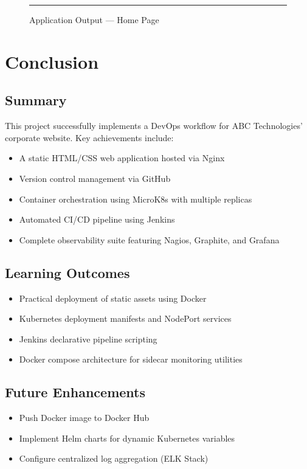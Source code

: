 \documentclass[12pt, a4paper]{article}
\begin{document}
\begin{figure}[H]
    \centering
    \rule{\textwidth}{8cm}
    \caption{Application Output --- Home Page}
    \label{fig:app_output}
\end{figure}

\newpage

\section{Conclusion}
\subsection{Summary}
This project successfully implements a DevOps workflow for ABC Technologies' corporate website. Key achievements include:
\begin{itemize}
    \item A static HTML/CSS web application hosted via Nginx
    \item Version control management via GitHub
    \item Container orchestration using MicroK8s with multiple replicas
    \item Automated CI/CD pipeline using Jenkins
    \item Complete observability suite featuring Nagios, Graphite, and Grafana
\end{itemize}

\subsection{Learning Outcomes}
\begin{itemize}
    \item Practical deployment of static assets using Docker
    \item Kubernetes deployment manifests and NodePort services
    \item Jenkins declarative pipeline scripting
    \item Docker compose architecture for sidecar monitoring utilities
\end{itemize}

\subsection{Future Enhancements}
\begin{itemize}
    \item Push Docker image to Docker Hub
    \item Implement Helm charts for dynamic Kubernetes variables
    \item Configure centralized log aggregation (ELK Stack)
\end{itemize}
\end{document}
